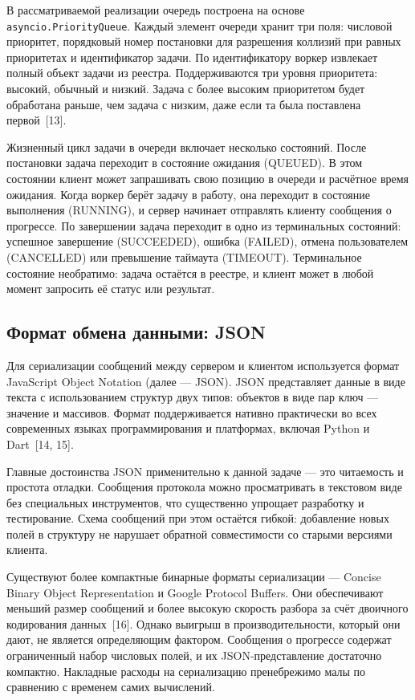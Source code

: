 \documentclass[14pt, russian]{scrartcl}
\begin{document}
В рассматриваемой реализации очередь построена на основе
\texttt{asyncio.PriorityQueue}. Каждый элемент очереди хранит три поля:
числовой приоритет, порядковый номер постановки для разрешения
коллизий при равных приоритетах и идентификатор задачи. По
идентификатору воркер извлекает полный объект задачи из реестра.
Поддерживаются три уровня приоритета: высокий, обычный и низкий.
Задача с более высоким приоритетом будет обработана раньше, чем задача
с низким, даже если та была поставлена первой~[13].

Жизненный цикл задачи в очереди включает несколько состояний.
После постановки задача переходит в состояние ожидания (QUEUED).
В этом состоянии клиент может запрашивать свою позицию в очереди и
расчётное время ожидания. Когда воркер берёт задачу в работу, она
переходит в состояние выполнения (RUNNING), и сервер начинает
отправлять клиенту сообщения о прогрессе. По завершении задача
переходит в одно из терминальных состояний: успешное завершение
(SUCCEEDED), ошибка (FAILED), отмена пользователем (CANCELLED) или
превышение таймаута (TIMEOUT). Терминальное состояние необратимо:
задача остаётся в реестре, и клиент может в любой момент запросить
её статус или результат.

\subsection{Формат обмена данными: JSON}

Для сериализации сообщений между сервером и клиентом используется формат 
JavaScript Object Notation (далее --- JSON). JSON представляет данные в виде
текста с использованием структур двух типов: объектов в виде пар ключ ---
значение и массивов. Формат поддерживается нативно практически во всех
современных языках программирования и платформах, включая Python и
Dart~[14, 15].

Главные достоинства JSON применительно к данной задаче --- это
читаемость и простота отладки. Сообщения протокола можно просматривать
в текстовом виде без специальных инструментов, что существенно упрощает
разработку и тестирование. Схема сообщений при этом остаётся гибкой:
добавление новых полей в структуру не нарушает обратной совместимости
со старыми версиями клиента.

Существуют более компактные бинарные форматы сериализации ---
Concise Binary Object Representation и Google Protocol Buffers. 
Они обеспечивают меньший размер сообщений и более высокую скорость разбора 
за счёт двоичного кодирования данных~[16]. Однако выигрыш в производительности,
который они дают, не является
определяющим фактором. Сообщения о прогрессе содержат ограниченный
набор числовых полей, и их JSON-представление достаточно компактно.
Накладные расходы на сериализацию пренебрежимо малы по сравнению с
временем самих вычислений.
\end{document}
